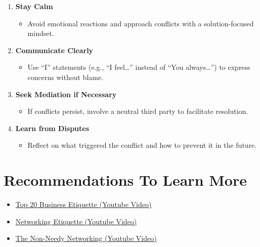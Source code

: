 \documentclass[
  letterpaper,
  DIV=11,
  numbers=noendperiod]{scrreprt}
\providecommand{\tightlist}{%
  \setlength{\itemsep}{0pt}\setlength{\parskip}{0pt}}\usepackage{longtable,booktabs,array}
\begin{document}
\begin{enumerate}
\def\labelenumi{\arabic{enumi}.}
\item
  \textbf{Stay Calm}

  \begin{itemize}
  \tightlist
  \item
    Avoid emotional reactions and approach conflicts with a
    solution-focused mindset.
  \end{itemize}
\item
  \textbf{Communicate Clearly}

  \begin{itemize}
  \tightlist
  \item
    Use ``I'' statements (e.g., ``I feel\ldots{}'' instead of ``You
    always\ldots{}'') to express concerns without blame.
  \end{itemize}
\item
  \textbf{Seek Mediation if Necessary}

  \begin{itemize}
  \tightlist
  \item
    If conflicts persist, involve a neutral third party to facilitate
    resolution.
  \end{itemize}
\item
  \textbf{Learn from Disputes}

  \begin{itemize}
  \tightlist
  \item
    Reflect on what triggered the conflict and how to prevent it in the
    future.
  \end{itemize}
\end{enumerate}

\section{Recommendations To Learn
More}\label{recommendations-to-learn-more-3}

\begin{itemize}
\tightlist
\item
  \href{https://www.youtube.com/watch?v=dvncaanrzUc&pp=ygUWUHJvZmVzc2lvbmFsIEV0aXF1ZXR0ZQ\%3D\%3D}{Top
  20 Business Etiquette (Youtube Video)}
\item
  \href{https://www.youtube.com/watch?v=jh_dlIye2Ug}{Networking
  Etiquette (Youtube Video)}
\item
  \href{https://www.youtube.com/watch?v=IInaPtwdNCQ}{The Non-Needy
  Networking (Youtube Video)}
\end{itemize}
\end{document}
